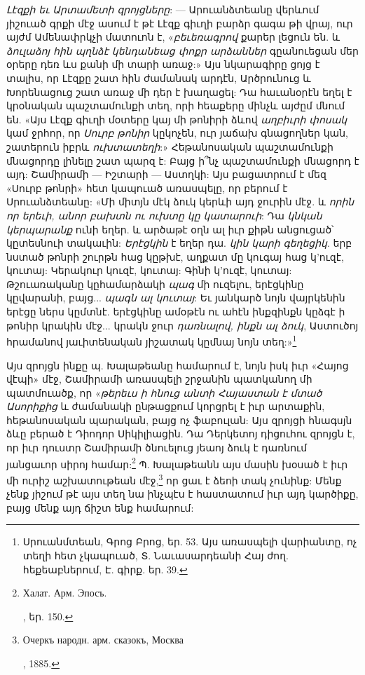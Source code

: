 \documentclass{article}
\begin{document}
{\emph{Լէզքի եւ Արտամետի զրոյցները}: — Արուանձտեանը վերևում յիշուած գրքի մէջ ասում է թէ Լէզք գիւղի բարձր գագա թի վրայ, ուր այժմ Ամենափրկչի մատուոն է, «\emph{բեւեռագրով} քարեր լեցուն են. և \emph{ձուլաձոյ հին պղնձէ կենդանեաց փոքր արձաններ} գըանուեցան մեր օրերը դեռ ևս քանի մի տարի առաջ:» Այս նկարագիրը ցոյց է տալիս, որ Լէզքը շատ հին ժամանակ արդէն, Արծրունուց և Խորենացուց շատ առաջ մի դեր է խաղացել: Դա հաւանօրէն եղել է կրօնական պաշտամունքի տեղ, որի հեաքերը մինչև այժըմ մնում են. «Այս Լէզք գիւղի մօտերը կայ մի թոնիրի ձևով \emph{աղբիւրի փոսակ} կամ ջրհոր, որ \emph{Սուրբ թոնիր} կըկոչեն, ուր յաճախ գնացողներ կան, շատերուն իբրև \emph{ուխտատեղի}:» Հեթանոսական պաշտամունքի մնացորդը լինելը շատ պարզ է: Բայց ի՞նչ պաշտամունքի մնացորդ է այդ: Շամիրամի — Իշտարի — Աստղկի: Այս բացատրում է մեզ «Սուրբ թոնրի» հետ կապուած առասպելը, որ բերում է Սրուանձտեանը: «Մի միտյն մէկ ձուկ կերևի այդ ջուրին մէջ. և \emph{որին որ երեւի, անոր բախտն ու ուխտը կը կատարուի}: Դա \emph{կնկան կերպարանք} ունի եղեր. և արծաթէ օղն ալ իւր քիթն անցուցած՝ կըտեսնուի տակաւին: \emph{Երէցկին} է եղեր դա. \emph{կին կարի գեղեցիկ}. երբ նստած թոնրի շուրթն հաց կըթխէ, աղքատ մը կուգայ հաց կ'ուզէ, կուտայ: Կերակուր կուզէ, կուտայ: Գինի կ'ուզէ, կուտայ: Թշուառականը կըհամարձակի \emph{պագ} մի ուզելու, երէցկինը կըվարանի, բայց... \emph{պագն ալ կուտայ}: Եւ յանկարծ նոյն վայրկենին երէցը ներս կըմտնէ. երէցկինը ամօթէն ու ահէն ինքզինքն կըձգէ ի թոնիր կրակին մէջ... կրակն ջուր \emph{դառնալով, ինքն ալ ձուկ}, Աստուծոյ հրամանով յաւիտենական յիշատակ կըմնայ նոյն տեղ:»\footnote{Սրուանմտեան, Գրոց Բրոց, եր. 53. Այս առասպելի վարիանտը, ոչ տեղի հետ չկապուած, Տ. Նաւասարդեանի Հայ ժող. հեքեաբներում, Է. գիրք. եր. 39.}

Այս զրոյցն ինքը պ. Խալաթեանը համարում է, նոյն իսկ իւր «Հայոց վէպի» մէջ, Շամիրամի առասպելի շրջանին պատկանող մի պատմուածք, որ «\emph{թերեւս ի հնուց անտի Հայաստան է մտած Ասորիքից} և ժամանակի ընթացքում կորցրել է իւր արտաքին, հեթանոսական պարական, բայց ոչ ֆաբուլան: Այս զրոյցի հնագսյն ձևը բերած է Դիոդոր Սիկիլիացին. Դա Դերկետոյ դիցուհու զրոյցն է, որ իւր դուստր Շամիրամի ծնուելուց յեաոյ ձուկ է դառնում յանցաւոր սիրոյ համար:\footnote{\begin{russian}Халат. Арм. Эпосъ.\end{russian}, եր. 150.} Պ. Խալաթեանն այս մասին խօսած է իւր մի ուրիշ աշխատութեան մէջ,\footnote{\begin{russian}Очеркъ народн. арм. сказокъ, Москва\end{russian}, 1885.} որ ցաւ է ձեոի տակ չունինք: Մենք չենք յիշում թէ այս տեղ նա ինչպէս է հաստատում իւր այդ կարծիքը, բայց մենք այդ ճիշտ ենք համարում:

}
\end{document}
